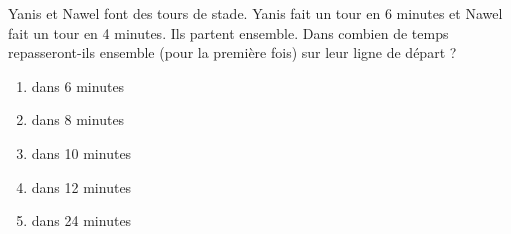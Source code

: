 Yanis et Nawel font des tours de stade. Yanis fait un tour en 6 minutes et Nawel fait un tour en 4 minutes. Ils partent ensemble. Dans combien de temps repasseront-ils ensemble (pour la première fois) sur leur ligne de départ ?
\begin{multicols}{5}
\begin{enumerate}[A/]
\item dans 6 minutes
\item dans 8 minutes
\item dans 10 minutes
\item dans 12 minutes
\item dans 24 minutes
\end{enumerate}  
\end{multicols}
